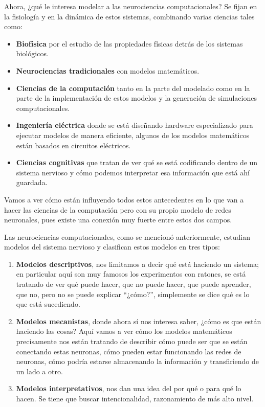 Ahora, ¿qué le interesa modelar a las neurociencias computacionales? Se fijan en la fisiología y en la dinámica de estos sistemas, combinando varias ciencias tales como: 
\begin{itemize}
 \item  \textbf{Biofísica} por el estudio de las propiedades físicas detrás de los sistemas biológicos.
 \item  \textbf{Neurociencias tradicionales} con modelos matemáticos. 
 \item  \textbf{Ciencias de la computación} tanto en la parte del modelado como en la parte de la implementación de estos modelos y la generación de simulaciones computacionales.
 \item  \textbf{Ingeniería eléctrica} donde se está diseñando hardware especializado para ejecutar modelos de manera eficiente, algunos de los modelos matemáticos están basados en circuitos eléctricos. 
 \item  \textbf{Ciencias cognitivas} que tratan de ver qué se está codificando dentro de un sistema nervioso y cómo podemos interpretar esa información que está ahí guardada.

\end{itemize}

Vamos a ver cómo están influyendo todos estos antecedentes en lo que van a hacer las ciencias de la computación pero con su propio modelo de redes neuronales, pues existe una conexión muy fuerte entre estos dos campos.


Las neurociencias computacionales, como se mencionó anteriormente, estudian modelos del sistema nervioso y clasifican estos modelos en tres tipos: 

\begin{enumerate}
 \item \textbf{Modelos descriptivos}, nos limitamos a decir qué está haciendo un sistema; en particular aquí son muy famosos los experimentos con ratones, se está tratando de ver qué puede hacer, que no puede hacer, que puede aprender, que no, pero no se puede explicar ``¿cómo?'', simplemente se dice qué es lo que está sucediendo.
 
 \item \textbf{Modelos mecanistas}, donde ahora sí nos interesa saber, ¿cómo es que están haciendo las cosas? Aquí vamos a ver cómo los modelos matemáticos precisamente nos están tratando de describir cómo puede ser que se están conectando estas neuronas, cómo pueden estar funcionando las redes de neuronas, cómo podría estarse almacenando la información y transfiriendo de un lado a otro.
 
 \item \textbf{Modelos interpretativos}, nos dan una idea del por qué o para qué lo hacen. Se tiene que buscar intencionalidad, razonamiento de más alto nivel.
\end{enumerate}


